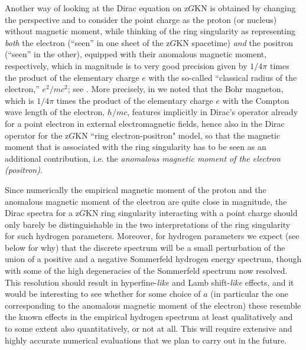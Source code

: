 \documentclass[11 pt]{article}
\renewcommand\({\left(}
\renewcommand\){\right)}
\newcommand\<{\langle}
\renewcommand\>{\rangle}
\newcommand\8{\infty}
\begin{document}
   Another way of looking at the Dirac equation on z$G$KN is obtained by changing the perspective and to consider the point charge as the proton
(or nucleus) without magnetic moment, while thinking of the ring singularity as representing \emph{both} the electron (``seen'' in one sheet of the z$G$KN 
spacetime) \emph{and} the positron (``seen'' in the other), equipped with their anomalous magnetic moment, respectively,
which in magnitude is to very good precision given by $1/4\pi$ times the product of the 
elementary charge $e$ with the so-called ``classical radius of the electron,'' $e^2/mc^2$; see \cite{KTZzGKNDc}. 
 More precisely, in \cite{KTZzGKNDc} we noted  that the Bohr magneton, which is $1/4\pi$ times the product of the 
elementary charge $e$ with the Compton wave length of the electron, $h/mc$, features implicitly in Dirac's operator 
already for a point electron in external electromagnetic fields,  hence also in the Dirac operator for the z$G$KN  ``ring electron-positron" model,
so that the magnetic moment that is associated with the ring singularity has to be seen as an additional contribution, i.e.  the 
\emph{anomalous magnetic moment of the electron (positron)}.
 
 Since numerically the empirical magnetic moment of the proton and the anomalous magnetic moment of the electron are quite close in magnitude,
 the Dirac spectra for a z$G$KN ring singularity interacting with a point charge should only barely be distinguishable in the two interpretations of the
 ring singularity for such hydrogen parameters. 
 Moreover, for hydrogen parameters we expect (see below for why) that the discrete spectrum will be a small perturbation of the union of a positive and a negative 
Sommerfeld hydrogen energy spectrum, though with some of the high degeneracies of the Sommerfeld spectrum now resolved. 
  This resolution should result in hyperfine-\emph{like} and Lamb shift-\emph{like} effects, and it would be interesting to see whether for some choice 
of $a$ (in particular the one corresponding to the anomalous magnetic moment of the electron) these resemble the known effects in the empirical 
hydrogen spectrum at least qualitatively and to some extent also quantitatively, or not at all. 
  This will require extensive and highly accurate numerical evaluations that we plan to carry out in the future.
 
\end{document}
